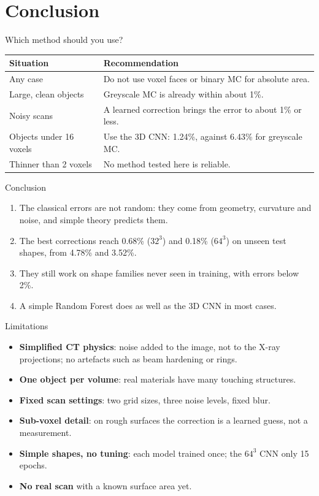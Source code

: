 \documentclass[aspectratio=169,11pt]{beamer}
\begin{document}
\section{Conclusion}
\begin{frame}{Which method should you use?}
  \centering
  \begin{tabular}{p{4cm}p{8.5cm}}
    \toprule
    Situation & Recommendation \\
    \midrule
    Any case & Do not use voxel faces or binary MC for absolute area. \\
    Large, clean objects & Greyscale MC is already within about 1\%. \\
    Noisy scans & A learned correction brings the error to about 1\% or less. \\
    Objects under 16 voxels & Use the 3D CNN: 1.24\%, against 6.43\% for greyscale MC. \\
    Thinner than 2 voxels & No method tested here is reliable. \\
    \bottomrule
  \end{tabular}
\end{frame}

\begin{frame}{Conclusion}
  \begin{enumerate}
    \item The classical errors are not random: they come from geometry, curvature and noise, and
          simple theory predicts them.
    \item The best corrections reach 0.68\% ($32^3$) and 0.18\% ($64^3$) on unseen test shapes,
          from 4.78\% and 3.52\%.
    \item They still work on shape families never seen in training, with errors below 2\%.
    \item A simple Random Forest does as well as the 3D CNN in most cases.
  \end{enumerate}
\end{frame}

\begin{frame}{Limitations}
  \begin{itemize}
    \item \textbf{Simplified CT physics}: noise added to the image, not to the X-ray projections; no
          artefacts such as beam hardening or rings.
    \item \textbf{One object per volume}: real materials have many touching structures.
    \item \textbf{Fixed scan settings}: two grid sizes, three noise levels, fixed blur.
    \item \textbf{Sub-voxel detail}: on rough surfaces the correction is a learned guess, not a
          measurement.
    \item \textbf{Simple shapes, no tuning}: each model trained once; the $64^3$ CNN only 15 epochs.
    \item \textbf{No real scan} with a known surface area yet.
  \end{itemize}
\end{frame}
\end{document}
